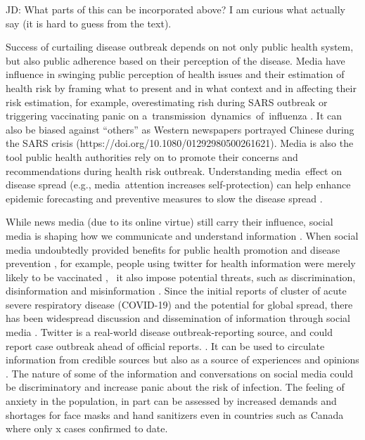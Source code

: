 
JD: What parts of this can be incorporated above? I am curious what \cite{BascHill20, SunYang20} actually say (it is hard to guess from the text).

Success of curtailing disease outbreak depends on not only public health system, but also public adherence based on their perception of the disease.  Media have influence in swinging public perception of health issues and their estimation of health risk by framing what to present and in what context and in affecting their risk estimation, for example, overestimating rish during SARS outbreak \citep{BerrWalf07} or triggering vaccinating panic on a transmission dynamics of influenza \citep{TuchDube11}.  It can also be biased against “others” as Western newspapers portrayed Chinese during the SARS crisis \citep{HuanLeun06} (https://doi.org/10.1080/01292980500261621).  Media is also the tool public health authorities rely on to promote their concerns and recommendations during health risk outbreak.  Understanding media effect on disease spread (e.g., media attention increases self-protection) can help enhance epidemic forecasting and preventive measures to slow the disease spread \citep{KimFast19}.  

While news media (due to its online virtue) still carry their influence, social media is shaping how we communicate and understand information \citep{LiuSieg19}.  When social media undoubtedly provided benefits for public health promotion and disease prevention \cite{BascHill20, SunYang20}, for example, people using twitter for health information were merely likely to be vaccinated \citep{AhmeQuin18},  it also impose potential threats, such as discrimination, disinformation and misinformation \citep{ChouOa18, McKevanS19}.  Since the initial reports of cluster of acute severe respiratory disease (COVID-19) and the potential for global spread, there has been widespread discussion and dissemination of information through social media \citep{?}.  Twitter is a real-world disease outbreak-reporting source, and could report case outbreak ahead of official reports. \citep{YoutDara19}.  It can be used to circulate information from credible sources but also as a source of experiences and opinions \citep{ChewEyes10}.  The nature of some of the information and conversations on social media could be discriminatory and increase panic about the risk of infection. The feeling of anxiety in the population, in part can be assessed by increased demands and shortages for face masks and hand sanitizers even in countries such as Canada where only x cases confirmed to date. 

